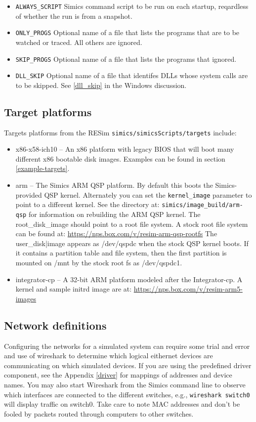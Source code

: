 \documentclass[titlepage]{article}
\begin{document}
\begin{itemize}
\item {\tt ALWAYS\_SCRIPT} Simics command script to be run on each startup, reqardless of whether the run is from a snapshot.
\item {\tt ONLY\_PROGS} Optional name of a file that lists the programs that are to be watched or traced.  All others are ignored.
\item {\tt SKIP\_PROGS} Optional name of a file that lists the programs that ignored.
\item {\tt DLL\_SKIP} Optional name of a file that identifes DLLs whose system calls are to be skipped.  See \ref{dll_skip} in the Windows discussion.
\end{itemize}

\subsection{Target platforms}
\label{target-platforms}
Targets platforms from the RESim {\tt simics/simicsScripts/targets} include:
\begin{itemize}
\item x86-x58-ich10 -- An x86 platform with legacy BIOS that will boot many different x86 bootable disk images. Examples can be found in
section \ref{example-targets}.
\item arm -- The Simics ARM QSP platform.  By default this boots the Simics-provided QSP kernel.  Alternately you can set the {\tt kernel\_image} 
parameter to point to a different kernel.  See the directory at:
\newline
{\tt simics/image\_build/arm-qsp} for information on rebuilding the ARM QSP kernel.  The root\_disk\_image should point to a root file system.
A stock root file system can be found at: 
\newline
\url{https://nps.box.com/v/resim-arm-qsp-rootfs}
The user\_disk|image appears as /dev/qspdc when the stock QSP kernel boots.  If it contains a partition table and file system, then the first
partition is mounted on /mnt by the stock root fs as /dev/qspdc1.

\item integrator-cp -- A 32-bit ARM platform modeled after the Integrator-cp.  A kernel and sample initrd image are at:
\newline
\url{https://nps.box.com/v/resim-arm5-images}
\end{itemize}


\subsection{Network definitions}
\label{networks}
Configuring the networks for a simulated system can require some trial and error and use of wireshark to determine which
logical eithernet devices are communicating on which simulated devices.  If you are using the predefined driver component, see the 
Appendix \ref{driver} for mappings of addresses and device names.  You may also start Wireshark from the Simics command line to 
observe which interfaces are connected to the different switches, e.g., {\tt wireshark switch0} will display traffic on switch0.
Take care to note MAC addresses and don't be fooled by packets routed through computers to other switches.
\end{document}
